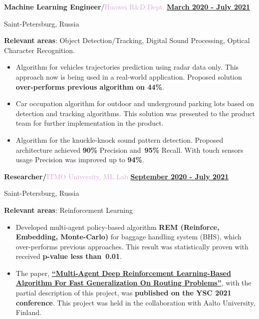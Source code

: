 \documentclass[11pt,a4paper]{report}
\begin{document}
\textbf{\large{Machine Learning Engineer}}/\textcolor{Plum}{Huawei R\&D Dept.}
\hfill
\textbf {\underline{March 2020 - July 2021}}

Saint-Petersburg, Russia

\textbf{Relevant areas}: Object Detection/Tracking, Digital Sound Processing, Optical Character Recognition.

\begin{itemize}[label={}, left=10pt]
    \item Algorithm for vehicles trajectories prediction using radar data only. This approach now is being used in a real-world application. Proposed solution \textbf{over-performs previous algorithm on 44\%}. 
    
    \item Car occupation algorithm for outdoor and underground parking lots based on detection and tracking algorithms. This solution was presented to the product team for further implementation in the product.
    
    \item Algorithm for the knuckle-knock sound pattern detection. Proposed architecture achieved \textbf{90\%} Precision and~\textbf{95\%} Recall. With touch sensors usage Precision was improved up to \textbf{94\%}.
\end{itemize}


\textbf{\large{Researcher/}}\textcolor{Plum}{ITMO University, ML Lab}
\hfill
\textbf {\underline{September 2020 - July 2021}}

Saint-Petersburg, Russia

\textbf{Relevant areas}: Reinforcement Learning

\begin{itemize}[label={}, left=10pt]
    \item Developed multi-agent policy-based algorithm \textbf{REM (Reinforce, Embedding, Monte-Carlo)} for baggage handling system (BHS), which over-performs previous approaches. This result was statistically proven with received \textbf{p-value less than~0.01}.
    
    \item The paper, 
    \textbf{\href{https://aaltodoc.aalto.fi/handle/123456789/111642}{\enquote{Multi-Agent Deep Reinforcement Learning-Based Algorithm For Fast Generalization On Routing Problems}}},
    with the partial description of this project, was \textbf{published on the YSC 2021 conference}. This project was held in the collaboration with Aalto University, Finland.
    
\end{itemize}
\end{document}
